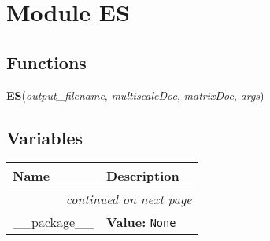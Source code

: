 %
%
%


\section{Module ES}

    \label{ES}


  \subsection{Functions}

    \label{ES:ES}

    \vspace{0.5ex}

\hspace{.8\funcindent}\begin{boxedminipage}{\funcwidth}

    \raggedright \textbf{ES}(\textit{output\_filename}, \textit{multiscaleDoc}, \textit{matrixDoc}, \textit{args})

\setlength{\parskip}{2ex}
\setlength{\parskip}{1ex}
    \end{boxedminipage}



  \subsection{Variables}

    \vspace{-1cm}
\hspace{\varindent}\begin{longtable}{|p{\varnamewidth}|p{\vardescrwidth}|l}
\cline{1-2}
\cline{1-2} \centering \textbf{Name} & \centering \textbf{Description}& \\
\cline{1-2}
\endhead\cline{1-2}\multicolumn{3}{r}{\small\textit{continued on next page}}\\\endfoot\cline{1-2}
\endlastfoot\raggedright \_\-\_\-p\-a\-c\-k\-a\-g\-e\-\_\-\_\- & \raggedright \textbf{Value:} 
{\tt None}&\\
\cline{1-2}
\end{longtable}

